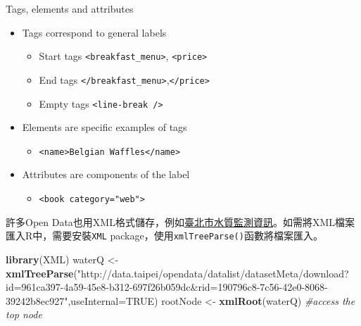 \documentclass[]{book}
\newenvironment{Shaded}{\begin{snugshade}}{\end{snugshade}}
\newcommand{\KeywordTok}[1]{\textcolor[rgb]{0.13,0.29,0.53}{\textbf{{#1}}}}
\newcommand{\DataTypeTok}[1]{\textcolor[rgb]{0.13,0.29,0.53}{{#1}}}
\newcommand{\StringTok}[1]{\textcolor[rgb]{0.31,0.60,0.02}{{#1}}}
\newcommand{\CommentTok}[1]{\textcolor[rgb]{0.56,0.35,0.01}{\textit{{#1}}}}
\newcommand{\OtherTok}[1]{\textcolor[rgb]{0.56,0.35,0.01}{{#1}}}
\newcommand{\NormalTok}[1]{{#1}}
\providecommand{\tightlist}{%
  \setlength{\itemsep}{0pt}\setlength{\parskip}{0pt}}
\theoremstyle{definition}
\theoremstyle{definition}
\theoremstyle{remark}
\begin{document}
Tags, elements and attributes

\begin{itemize}
\tightlist
\item
  Tags correspond to general labels

  \begin{itemize}
  \tightlist
  \item
    Start tags \texttt{\textless{}breakfast\_menu\textgreater{}},
    \texttt{\textless{}price\textgreater{}}
  \item
    End tags
    \texttt{\textless{}/breakfast\_menu\textgreater{}},\texttt{\textless{}/price\textgreater{}}
  \item
    Empty tags \texttt{\textless{}line-break\ /\textgreater{}}
  \end{itemize}
\item
  Elements are specific examples of tags

  \begin{itemize}
  \tightlist
  \item
    \texttt{\textless{}name\textgreater{}Belgian\ Waffles\textless{}/name\textgreater{}}
  \end{itemize}
\item
  Attributes are components of the label

  \begin{itemize}
  \tightlist
  \item
    \texttt{\textless{}book\ category="web"\textgreater{}}
  \end{itemize}
\end{itemize}

許多Open
Data也用XML格式儲存，例如\href{http://data.taipei/opendata/datalist/datasetMeta/download?id=961ca397-4a59-45e8-b312-697f26b059dc\&rid=190796c8-7c56-42e0-8068-39242b8ec927}{臺北市水質監測資訊}。如需將XML檔案匯入R中，需要安裝\texttt{XML}
\citep{R-XML} package，使用\texttt{xmlTreeParse()}函數將檔案匯入。

\begin{Shaded}
\begin{Highlighting}[]
\KeywordTok{library}\NormalTok{(XML)}
\NormalTok{waterQ <-}\StringTok{ }\KeywordTok{xmlTreeParse}\NormalTok{(}\StringTok{"http://data.taipei/opendata/datalist/datasetMeta/download?id=961ca397-4a59-45e8-b312-697f26b059dc&rid=190796c8-7c56-42e0-8068-39242b8ec927"}\NormalTok{,}\DataTypeTok{useInternal=}\OtherTok{TRUE}\NormalTok{)}
\NormalTok{rootNode <-}\StringTok{ }\KeywordTok{xmlRoot}\NormalTok{(waterQ) }\CommentTok{#access the top node}
\end{Highlighting}
\end{Shaded}
\end{document}
